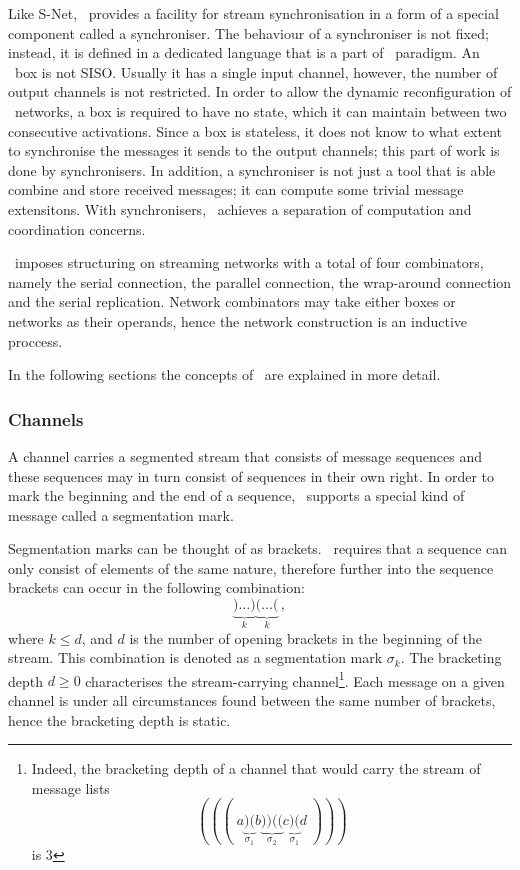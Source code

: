 Like S-Net, \ak\ provides a facility for stream synchronisation in a form of a special component called a synchroniser. The behaviour of a synchroniser is not fixed; instead, it is defined in a dedicated language that is a part of \ak\ paradigm. An \ak\ box is not SISO. Usually it has a single input channel, however, the number of output channels is not restricted. In order to allow the dynamic reconfiguration of \ak\ networks, a box is required to have no state, which it can maintain between two consecutive activations. Since a box is stateless, it does not know to what extent to synchronise the messages it sends to the output channels; this part of work is done by synchronisers. In addition, a synchroniser is not just a tool that is able combine and store received messages; it can compute some trivial message extensitons. With synchronisers, \ak\ achieves a separation of computation and coordination concerns.

\ak\ imposes structuring on streaming networks with a total of four combinators, namely the serial connection, the parallel connection, the wrap-around connection and the serial replication. Network combinators may take either boxes or networks as their operands, hence the network construction is an inductive proccess. 

In the following sections the concepts of \ak\ are explained in more detail.


    \subsubsection{Channels}
A channel carries a segmented stream that consists of message sequences and these sequences may in turn consist of sequences in their own right. In order to mark the beginning and the end of a sequence, \ak\ supports a special kind of message called a segmentation mark.

Segmentation marks can be thought of as brackets. \ak\ requires that a sequence can only consist of elements of the same nature, therefore further into the sequence brackets can occur in the following combination:
\[
\underbrace{)\ldots)}_k \underbrace{(\ldots(}_k\,,
\]
where $k \le d$, and $d$ is the number of opening brackets in the beginning of the stream. This combination is denoted as a segmentation mark $\sigma_k$. The bracketing depth $d \ge 0$ characterises the stream-carrying channel\footnote{Indeed, the bracketing depth of a channel that would carry the stream of message lists
\[
(((\;a\underbrace{)(}_{\sigma_1}b\underbrace{))((}_{\sigma_2}c\underbrace{)(}_{\sigma_1}d\;)))
\]
is 3}. Each message on a given channel is under all circumstances found between the same number of brackets, hence the bracketing depth is static.


